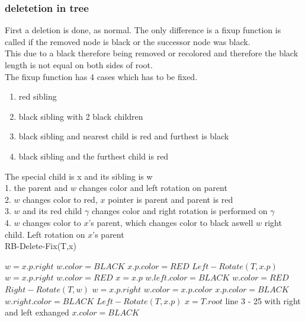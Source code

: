 \documentclass[12pt, a4paper]{article}
\begin{document}
			\subsubsection{deletetion in tree}
				First a deletion is done, as normal. The only difference is a fixup function is called if the removed node is black or the successor node was black.\\
				This due to a black therefore being removed or recolored and therefore the black length is not equal on both sides of root.\\
				The fixup function has 4 cases which has to be fixed.
				\begin{enumerate}
					\item red sibling
					\item black sibling with 2 black children
					\item black sibling and nearest child is red and furthest is black
					\item black sibling and the furthest child is red
				\end{enumerate}
				The special child is x and its sibling is w\\
				1. the parent and $w$ changes color and left rotation on parent\\
				2. $w$ changes color to red, $x$ pointer is parent and parent is red\\
				3. $w$ and its red child $\gamma$ changes color and right rotation is performed on $\gamma$\\
				4. $w$ changes color to $x$'s parent, which changes color to black aswell $w$ right child. Left rotation on $x$'s parent\\
				RB-Delete-Fix(T,x)
				\begin{algorithmic}[1]
							\State $w = x.p.right$
								\State $w.color = BLACK$
								\State $x.p.color = RED$
								\State $Left-Rotate(T,x.p)$
								\State $w = x.p.right $
							\EndIf
								\State $w.color = RED$
								\State $x = x.p$
							\Else
									\State $w.left.color = BLACK$
									\State $w.color = RED$
									\State $Right-Rotate(T,w)$
									\State $w = x.p.right$
								\EndIf
								\State $w.color = x.p.color$
								\State $x.p.color = BLACK$
								\State $w.right.color = BLACK$
								\State $Left-Rotate(T,x.p)$
								\State $x = T.root$
							\EndIf
						\Else
							\State line 3 - 25 with right and left exhanged
						\EndIf
					\EndWhile
					\State $x.color = BLACK$
				\end{algorithmic}
				
\end{document}
